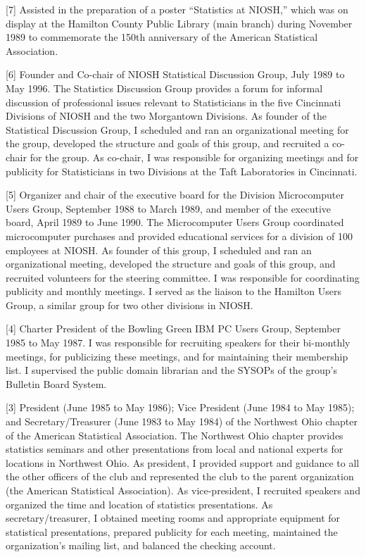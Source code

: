 \documentclass[
  12pt,
]{article}
\begin{document}
{[}7{]} Assisted in the preparation of a poster ``Statistics at NIOSH,''
which was on display at the Hamilton County Public Library (main branch)
during November 1989 to commemorate the 150th anniversary of the
American Statistical Association.

{[}6{]} Founder and Co-chair of NIOSH Statistical Discussion Group, July
1989 to May 1996. The Statistics Discussion Group provides a forum for
informal discussion of professional issues relevant to Statisticians in
the five Cincinnati Divisions of NIOSH and the two Morgantown Divisions.
As founder of the Statistical Discussion Group, I scheduled and ran an
organizational meeting for the group, developed the structure and goals
of this group, and recruited a co-chair for the group. As co-chair, I
was responsible for organizing meetings and for publicity for
Statisticians in two Divisions at the Taft Laboratories in Cincinnati.

{[}5{]} Organizer and chair of the executive board for the Division
Microcomputer Users Group, September 1988 to March 1989, and member of
the executive board, April 1989 to June 1990. The Microcomputer Users
Group coordinated microcomputer purchases and provided educational
services for a division of 100 employees at NIOSH. As founder of this
group, I scheduled and ran an organizational meeting, developed the
structure and goals of this group, and recruited volunteers for the
steering committee. I was responsible for coordinating publicity and
monthly meetings. I served as the liaison to the Hamilton Users Group, a
similar group for two other divisions in NIOSH.

{[}4{]} Charter President of the Bowling Green IBM PC Users Group,
September 1985 to May 1987. I was responsible for recruiting speakers
for their bi-monthly meetings, for publicizing these meetings, and for
maintaining their membership list. I supervised the public domain
librarian and the SYSOPs of the group's Bulletin Board System.

{[}3{]} President (June 1985 to May 1986); Vice President (June 1984 to
May 1985); and Secretary/Treasurer (June 1983 to May 1984) of the
Northwest Ohio chapter of the American Statistical Association. The
Northwest Ohio chapter provides statistics seminars and other
presentations from local and national experts for locations in Northwest
Ohio. As president, I provided support and guidance to all the other
officers of the club and represented the club to the parent organization
(the American Statistical Association). As vice-president, I recruited
speakers and organized the time and location of statistics
presentations. As secretary/treasurer, I obtained meeting rooms and
appropriate equipment for statistical presentations, prepared publicity
for each meeting, maintained the organization's mailing list, and
balanced the checking account.
\end{document}
